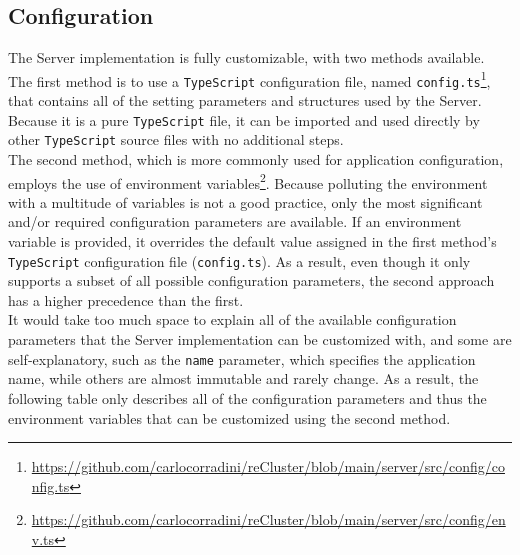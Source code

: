 \subsection{Configuration}
\label{subsec:implementation_server_configuration}

The Server implementation is fully customizable, with two methods available. \\ %
The first method is to use a \texttt{TypeScript} configuration file, named
\texttt{config.ts}\footnote{\url{https://github.com/carlocorradini/reCluster/blob/main/server/src/config/config.ts}},
that contains all of the setting parameters and structures used by the Server. Because
it is a pure \texttt{TypeScript} file, it can be imported and used directly by other
\texttt{TypeScript} source files with no additional steps. \\ %
The second method, which is more commonly used for application configuration,
employs the use of environment variables\footnote{\url{https://github.com/carlocorradini/reCluster/blob/main/server/src/config/env.ts}}.
Because polluting the environment with a multitude of variables is not a good practice,
only the most significant and/or required configuration parameters are available.
If an environment variable is provided, it overrides the default value assigned
in the first method's \texttt{TypeScript} configuration file (\texttt{config.ts}).
As a result, even though it only supports a subset of all possible configuration
parameters, the second approach has a higher precedence than the first. \\ %
It would take too much space to explain all of the available configuration parameters
that the Server implementation can be customized with, and some are self-explanatory,
such as the \texttt{name} parameter, which specifies the application name, while
others are almost immutable and rarely change. As a result, the following table
only describes all of the configuration parameters and thus the environment
variables that can be customized using the second method.

